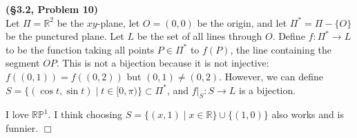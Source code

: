 \documentclass[12pt]{article}
\theoremstyle{definition}
\newenvironment{Solution}{\noindent {\sc Solution.}}{$\Box$ \vspace{2 ex}}
\begin{document}
\vspace{0.5cm}

\begin{Solution}
{\bf (\S3.2, Problem 10)}\\
Let $\Pi = \mathbb R^2$ be the $xy$-plane, let $O=(0,0)$ be the origin, and let $\Pi^\ast = \Pi - \{O\}$ be the punctured plane. Let $L$ be the set of all lines through $O$. Define $f : \Pi^\ast\to L$ to be the function taking all points $P \in \Pi^\ast$ to $f(P)$, the line containing the segment $OP$. This is not a bijection because it is not injective: $f((0,1))=f((0, 2))$ but $(0,1)\ne(0,2)$. However, we can define $S=\{(\cos t, \sin t) \mid t \in [0, \pi)\} \subset \Pi^\ast$, and $f|_S : S \to L$ is a bijection. 

I love $\mathbb {RP}^1$. I think choosing $S = \{(x,1) \mid x\in \mathbb R\} \cup \{(1,0)\}$ also works and is funnier.
\end{Solution}

\vspace{0.5cm}
\end{document}

